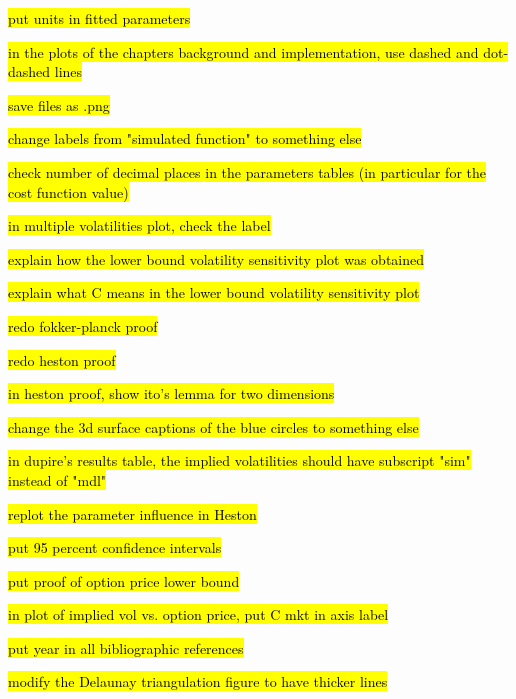 \hl{put units in fitted parameters}


\hl{in the plots of the chapters background and implementation, use dashed and dot-dashed lines}

\hl{save files as .png}

\hl{change labels from "simulated function" to something else}

\hl{check number of decimal places in the parameters tables (in particular for the cost function value)}

\hl{in multiple volatilities plot, check the label}

\hl{explain how the  lower bound volatility sensitivity plot was obtained}

\hl{explain what C means in the lower bound volatility sensitivity plot}

\hl{redo fokker-planck proof}

\hl{redo heston proof}

\hl{in heston proof, show ito's lemma for two dimensions}

\hl{change the 3d surface captions of the blue circles to something else}

\hl{in dupire's results table, the implied volatilities should have subscript "sim" instead of "mdl"}

\hl{replot the parameter influence in Heston}

\hl{put 95 percent confidence intervals}

\hl{put proof of option price lower bound}

\hl{in plot of implied vol vs. option price, put C mkt in axis label}

\hl{put year in all bibliographic references}

\hl{modify the Delaunay triangulation figure to have thicker lines}